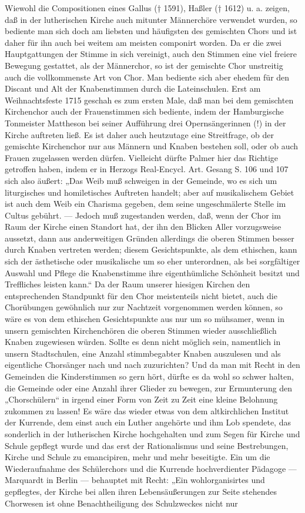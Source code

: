 Wiewohl die Compositionen eines Gallus († 1591), Haßler († 1612) u. a. zeigen, daß in der lutherischen Kirche auch mitunter Männerchöre verwendet wurden, so bediente man sich doch am liebsten und häufigsten des gemischten Chors und ist daher für ihn auch bei weitem am meisten componirt worden. Da er die zwei Hauptgattungen der Stimme in sich vereinigt, auch den Stimmen eine viel freiere Bewegung gestattet, als der Männerchor, so ist der gemischte Chor unstreitig auch die vollkommenste Art von Chor. Man bediente sich aber ehedem für den Discant und Alt der Knabenstimmen durch die Lateinschulen. Erst am Weihnachtsfeste 1715 geschah es zum ersten Male, daß man bei dem gemischten Kirchenchor auch der Frauenstimmen sich bediente, indem der Hamburgische Tonmeister
Mattheson bei seiner Aufführung drei Opernsängerinnen (!) in der Kirche auftreten ließ. Es ist daher auch heutzutage eine Streitfrage, ob der gemischte Kirchenchor nur aus Männern und Knaben bestehen soll, oder ob auch Frauen zugelassen werden dürfen. Vielleicht dürfte Palmer hier das Richtige getroffen haben, indem er in Herzogs Real-Encycl. Art. Gesang S. 106 und 107 sich also äußert: „Das Weib muß schweigen in der Gemeinde, wo es sich um liturgisches und homiletisches Auftreten handelt; aber auf musikalischem Gebiet ist auch dem Weib ein Charisma gegeben, dem seine ungeschmälerte Stelle im Cultus gebührt. — Jedoch muß zugestanden werden, daß, wenn der Chor im Raum der Kirche einen Standort hat, der ihn den Blicken Aller vorzugsweise aussetzt, dann aus anderweitigen Gründen allerdings die oberen Stimmen besser durch Knaben vertreten werden; diesem Gesichtspunkte, als dem ethischen, kann sich der ästhetische oder musikalische um so eher unterordnen, als bei sorgfältiger Auswahl und Pflege die Knabenstimme ihre eigenthümliche Schönheit besitzt und Treffliches leisten kann.“ Da der Raum unserer hiesigen Kirchen den entsprechenden Standpunkt für den Chor meistenteils nicht bietet, auch die Chorübungen gewöhnlich nur zur Nachtzeit vorgenommen werden können, so wäre es von dem ethischen Gesichtspunkte aus nur um so mühsamer, wenn in unsern gemischten Kirchenchören die oberen Stimmen wieder ausschließlich Knaben zugewiesen würden. Sollte es denn nicht möglich sein, namentlich in unsern Stadtschulen, eine Anzahl stimmbegabter Knaben auszulesen und als eigentliche Chorsänger nach und nach zuzurichten? Und da man mit Recht in den Gemeinden die Kinderstimmen so gern hört, dürfte es da wohl so schwer halten, die Gemeinde oder eine Anzahl ihrer Glieder zu bewegen, zur Ermunterung den „Chorschülern“ in irgend einer Form von Zeit zu Zeit eine kleine Belohnung zukommen zu lassen! Es wäre das wieder etwas von dem altkirchlichen Institut der Kurrende, dem einst auch ein Luther angehörte und ihm Lob spendete, das sonderlich in der lutherischen Kirche hochgehalten und zum Segen für Kirche und Schule gepflegt wurde und das erst der Rationalismus und seine Bestrebungen, Kirche und Schule zu emancipiren, mehr und mehr beseitigte. Ein um die Wiederaufnahme des Schülerchors und die Kurrende hochverdienter Pädagoge — Marquardt in Berlin — behauptet mit Recht: „Ein wohlorganisirtes und gepflegtes, der Kirche bei allen ihren Lebensäußerungen zur Seite stehendes Chorwesen ist ohne Benachtheiligung des Schulzweckes nicht nur 